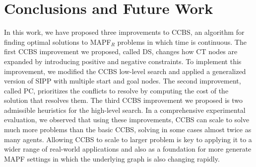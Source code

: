 \documentclass[letterpaper]{article} %
\newcommand{\ccbs}{\ac{CCBS}\xspace}
\newcommand{\ct}{\ac{CT}\xspace}
\newcommand{\sipp}{\ac{SIPP}\xspace}
\newcommand{\mapfr}{{MAPF}$_R$\xspace}
\newcommand{\mapf}{\ac{MAPF}\xspace}
\newcommand{\pc}{\ac{PC}\xspace}
\newcommand{\ds}{\ac{DS}\xspace}
\begin{document}
\section{Conclusions and Future Work}
In this work, we have proposed three improvements to \ccbs, an algorithm for finding optimal solutions to \mapfr problems in which time is continuous.
The first \ccbs improvement we proposed, called \ds, changes how \ct nodes are expanded by introducing positive and negative constraints.
To implement this improvement, we modified the \ccbs low-level search and applied a generalized version of \sipp with multiple start and goal nodes.
The second improvement, called \pc, prioritizes the conflicts to resolve by computing the cost of the solution that resolves them.
The third \ccbs improvement we proposed is two admissible heuristics for the high-level search.
In a comprehensive experimental evaluation, we observed that using these improvements, \ccbs can scale to solve much more problems than the basic \ccbs, solving in some cases almost twice as many agents.
Allowing \ccbs to scale to larger problem is key to applying it to a wider range of real-world applications and also as a foundation for more generate \mapf settings in which the underlying graph is also changing rapidly.



\clearpage

\end{document}
